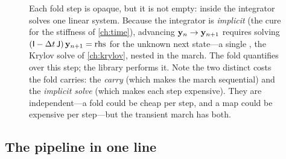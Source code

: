 \begin{figure}[t]
\centering
{}
\caption[The implicit solve inside each fold step]{Each fold step is opaque, but it
is not empty: inside  the integrator solves one linear system.
Because the integrator is \emph{implicit} (the cure for the stiffness of
\cref{ch:time}), advancing $\mathbf{y}_n\to\mathbf{y}_{n+1}$ requires solving
$(\mathsf{I}-\Delta t\,\mathsf{J})\,\mathbf{y}_{n+1}=\text{rhs}$ for the unknown next state---a
single , the Krylov solve of \cref{ch:krylov}, nested in the march.
The fold quantifies over this step; the library performs it. Note the two distinct
costs the fold carries: the \emph{carry} (which makes the march sequential) and the
\emph{implicit solve} (which makes each step expensive). They are independent---a
fold could be cheap per step, and a map could be expensive per step---but the
transient march has both.}
\label{fig:tr-innersolve}
\end{figure}

\subsection{The pipeline in one line}

